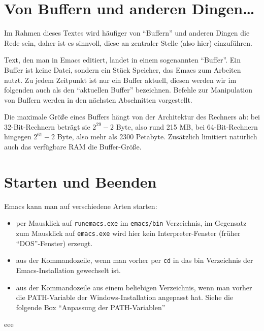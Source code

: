 \documentclass[12pt,ngerman]{scrbook}
\begin{document}
\section{Von Buffern und anderen Dingen\ldots}

Im Rahmen dieses Textes wird häufiger von \enquote{Buffern} und anderen Dingen die Rede sein, daher ist es sinnvoll, diese an zentraler Stelle (also hier) einzuführen.

Text, den man in Emacs editiert, landet in einem sogenannten \enquote{Buffer}. Ein Buffer ist keine Datei, sondern ein Stück Speicher, das Emacs zum Arbeiten nutzt. Zu jedem Zeitpunkt ist nur ein Buffer aktuell, diesen werden wir im folgenden auch als den \enquote{aktuellen Buffer} bezeichnen. Befehle zur Manipulation von Buffern werden in den nächsten Abschnitten vorgestellt.

Die maximale Größe eines Buffers hängt von der Architektur des Rechners ab: bei 32-Bit-Rechnern beträgt sie $2^29 - 2$ Byte, also rund 215 MB, bei 64-Bit-Rechnern hingegen $2^61-2$ Byte, also mehr als 2300 Petabyte. Zusätzlich limitiert natürlich auch das verfügbare RAM die Buffer-Größe.

\section{Starten und Beenden}

Emacs kann man auf verschiedene Arten starten:

\begin{itemize}
	\item per Mausklick auf \texttt{runemacs.exe} im \texttt{emacs/bin} Verzeichnis, im Gegensatz zum Mausklick auf \texttt{emacs.exe} wird hier kein Interpreter-Fenster (früher \enquote{DOS}-Fenster) erzeugt.
	\item aus der Kommandozeile, wenn man vorher per \texttt{cd} in das bin Verzeichnis der Emacs-Installation gewechselt ist. 
	\item aus der Kommandozeile aus einem beliebigen Verzeichnis, wenn man vorher die PATH-Variable der Windows-Installation angepasst hat. Siehe die folgende Box \enquote{Anpassung der PATH-Variablen}
\end{itemize}

\begin{tcolorbox}[title={Anpassung der PATH-Variablen}]

eee

\end{tcolorbox}
\end{document}
